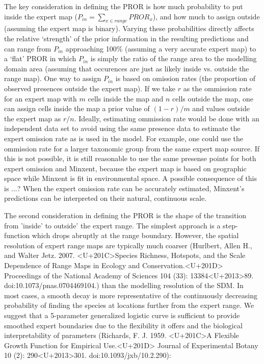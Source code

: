 The key consideration in defining the PROR is how much probability to put inside the expert map ($P_{in}=\sum\nolimits_{x \in range} PROR_x$), and how much to assign outside (assuming the expert map is binary). Varying these probabilities directly affects the relative `strength' of the prior information in the resulting predictions and can range from $P_{in}$ approaching 100\%  (assuming a very accurate expert map) to a `flat' PROR in which $P_{in}$ is simply the ratio of the range area to the modelling domain area (assuming that occurences are just as likely inside vs. outside the range map).  
One way to assign $P_{in}$ is based on omission rates (the proportion of observed presences outside the expert map). If we take $r$ as the ommission rate for an expert map with $m$ cells inside the map and $n$ cells outside the map, one can assign cells inside the map a prior value of $(1-r)/m$ and values outside the expert map as $r/n$. Ideally, estimating ommission rate would be done with an independent data set to avoid using the same presence data to estimate the expert omission rate as is used in the model. For example, one could use the ommission rate for a larger taxonomic group from the same expert map source. If this is not possible, it is still reasonable to use the same presense points for both expert omission and Minxent, because the expert map is based on geographic space while Minxent is fit in environmental space. A possible consequence of this is ...? When the expert omission rate can be accurately estimated, Minxent's predictions can be interpreted on their natural, continuous scale.  


The second consideration in defining the PROR is the shape of the transition from 'inside' to outside' the expert range.  The simplest approach is a step-function which drops abruptly at the range boundary.  However, the spatial resolution of expert range maps are typically much coarser (Hurlbert, Allen H., and Walter Jetz. 2007. <U+201C>Species Richness, Hotspots, and the Scale Dependence of Range Maps in Ecology and Conservation.<U+201D> Proceedings of the National Academy of Sciences 104 (33): 13384<U+2013>89. doi:10.1073/pnas.0704469104.) than the modelling resolution of the SDM. In most cases, a smooth decay is more representative of the continuously decreasing probability of finding the species at locations further from the expert range.  We suggest that a 5-parameter generalized logistic curve is sufficient to provide smoothed expert boundaries due to the flexibility it offers and the biological interpretability of parameters  (Richards, F. J. 1959. <U+201C>A Flexible Growth Function for Empirical Use.<U+201D> Journal of Experimental Botany 10 (2): 290<U+2013>301. doi:10.1093/jxb/10.2.290):


